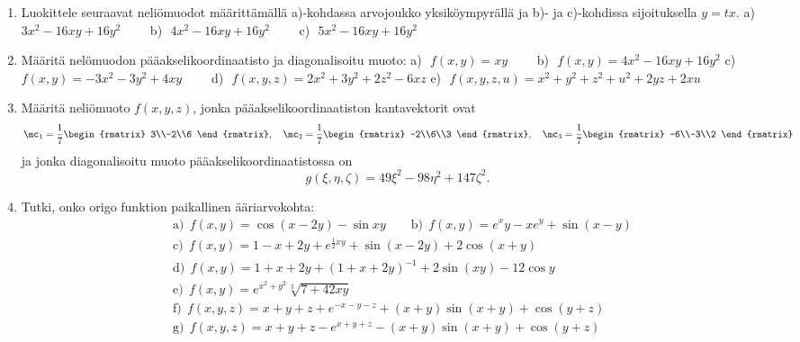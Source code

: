 \pagebreak

\Harj
\begin{enumerate}

\item
Luokittele seuraavat neliömuodot määrittämällä a)-kohdassa arvojoukko yksiköympyrällä ja
b)- ja c)-kohdissa sijoituksella $y=tx$. \vspace{1mm}\newline
a)\,\ $3x^2-16xy+16y^2 \qquad$
b)\,\ $4x^2-16xy+16y^2 \qquad$
c)\,\ $5x^2-16xy+16y^2$

\item
Määritä nelömuodon pääakselikoordinaatisto ja diagonalisoitu muoto: \vspace{1mm}\newline
a)\,\ $f(x,y)=xy \qquad$
b)\,\ $f(x,y)=4x^2-16xy+16y^2$ \newline
c)\,\ $f(x,y)=-3x^2-3y^2+4xy \qquad$
d)\,\ $f(x,y,z)=2x^2+3y^2+2z^2-6xz$ \newline
e)\,\ $f(x,y,z,u)=x^2+y^2+z^2+u^2+2yz+2xu$

\item
Määritä neliömuoto $f(x,y,z)$, jonka pääakselikoordinaatiston kantavektorit ovat
\[
\mc_1=\frac{1}{7} \begin{rmatrix} 3\\-2\\6 \end{rmatrix}, \quad
\mc_2=\frac{1}{7} \begin{rmatrix} -2\\6\\3 \end{rmatrix}, \quad
\mc_3=\frac{1}{7} \begin{rmatrix} -6\\-3\\2 \end{rmatrix}
\]
ja jonka diagonalisoitu muoto pääakselikoordinaatistossa on
\[
g(\xi,\eta,\zeta)=49\xi^2-98\eta^2+147\zeta^2.
\]

\item 
Tutki, onko origo funktion paikallinen ääriarvokohta:
\begin{align*}
&\text{a)}\ \ f(x,y)=\cos(x-2y)-\sin xy \qquad
 \text{b)}\ \ f(x,y)=e^x y-xe^y+\sin(x-y) \\
&\text{c)}\ \ f(x,y)=1-x+2y+e^{\frac 12 xy} +\sin(x-2y)+2\cos(x+y)\\[1mm]
&\text{d)}\ \ f(x,y)=1+x+2y+(1+x+2y)^{-1}+2\sin(xy)-12\cos y \\
&\text{e)}\ \ f(x,y)=e^{x^2+y^2}\sqrt[3]{7+42xy} \\[1mm]
&\text{f)}\ \ f(x,y,z)=x+y+z+e^{-x-y-z}+(x+y)\sin(x+y)+\cos(y+z)\\[0.5mm]
&\text{g)}\ \ f(x,y,z)=x+y+z-e^{x+y+z}-(x+y)\sin(x+y)+\cos(y+z)
\end{align*}


\end{enumerate}
